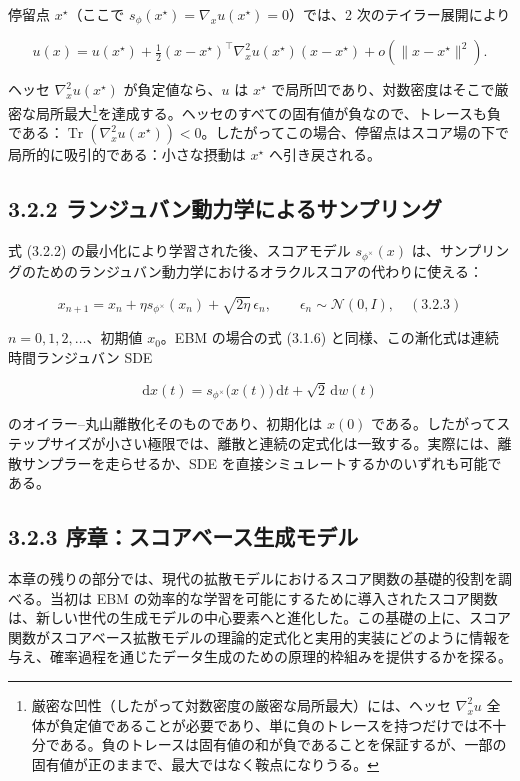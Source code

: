 停留点 $x^\star$（ここで $s_\phi(x^\star)=\nabla_x u(x^\star)=0$）では、2 次のテイラー展開により

\[
u(x) = u(x^\star) + \tfrac{1}{2}(x-x^\star)^\top\nabla_x^2 u(x^\star)(x-x^\star) + o(\|x-x^\star\|^2).
\]


ヘッセ $\nabla_x^2 u(x^\star)$ が負定値なら、$u$ は $x^\star$ で局所凹であり、対数密度はそこで厳密な局所最大\footnote{厳密な凹性（したがって対数密度の厳密な局所最大）には、ヘッセ $\nabla_x^2 u$ 全体が負定値であることが必要であり、単に負のトレースを持つだけでは不十分である。負のトレースは固有値の和が負であることを保証するが、一部の固有値が正のままで、最大ではなく鞍点になりうる。}を達成する。ヘッセのすべての固有値が負なので、トレースも負である：$\operatorname{Tr}(\nabla_x^2 u(x^\star))<0$。したがってこの場合、停留点はスコア場の下で局所的に吸引的である：小さな摂動は $x^\star$ へ引き戻される。

\subsection*{3.2.2 ランジュバン動力学によるサンプリング}


式 (3.2.2) の最小化により学習された後、スコアモデル $s_{\phi^\times}(x)$ は、サンプリングのためのランジュバン動力学におけるオラクルスコアの代わりに使える：

\[
x_{n+1} = x_n + \eta s_{\phi^\times}(x_n) + \sqrt{2\eta}\,\epsilon_n, \qquad \epsilon_n\sim\mathcal{N}(0,I),\quad (3.2.3)
\]


$n=0,1,2,\ldots$、初期値 $x_0$。EBM の場合の式 (3.1.6) と同様、この漸化式は連続時間ランジュバン SDE

\[
\mathrm{d}x(t) = s_{\phi^\times}\bigl(x(t)\bigr)\,\mathrm{d}t + \sqrt{2}\,\mathrm{d}w(t)
\]


のオイラー–丸山離散化そのものであり、初期化は $x(0)$ である。したがってステップサイズが小さい極限では、離散と連続の定式化は一致する。実際には、離散サンプラーを走らせるか、SDE を直接シミュレートするかのいずれも可能である。

\subsection*{3.2.3 序章：スコアベース生成モデル}


本章の残りの部分では、現代の拡散モデルにおけるスコア関数の基礎的役割を調べる。当初は EBM の効率的な学習を可能にするために導入されたスコア関数は、新しい世代の生成モデルの中心要素へと進化した。この基礎の上に、スコア関数がスコアベース拡散モデルの理論的定式化と実用的実装にどのように情報を与え、確率過程を通じたデータ生成のための原理的枠組みを提供するかを探る。


